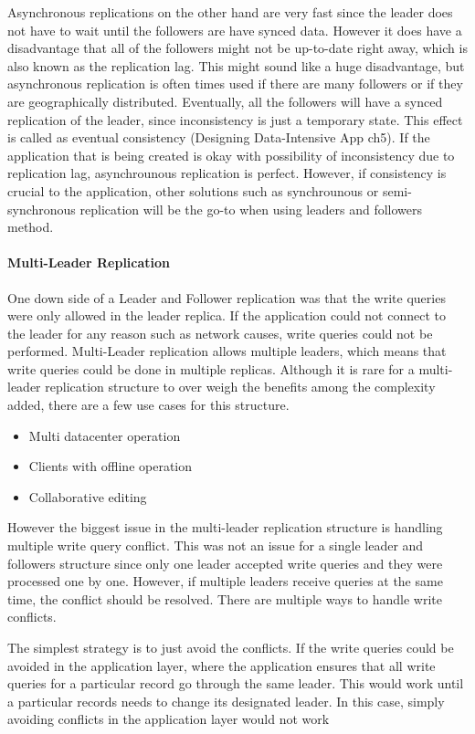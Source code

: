 Asynchronous replications on the other hand are very fast since the leader does not have to wait until the followers are have synced data. However it does have a disadvantage that all of the followers might not be up-to-date right away, which is also known as the replication lag. This might sound like a huge disadvantage, but asynchronous replication is often times used if there are many followers or if they are geographically distributed. Eventually, all the followers will have a synced replication of the leader, since inconsistency is just a temporary state. This effect is called as eventual consistency (Designing Data-Intensive App ch5). If the application that is being created is okay with possibility of inconsistency due to replication lag, asynchrounous replication is perfect. However, if consistency is crucial to the application, other solutions such as synchrounous or semi-synchronous replication will be the go-to when using leaders and followers method. 


\paragraph{Multi-Leader Replication}
One down side of a Leader and Follower replication was that the write queries were only allowed in the leader replica. If the application could not connect to the leader for any reason such as network causes, write queries could not be performed. Multi-Leader replication allows multiple leaders, which means that write queries could be done in multiple replicas. 
Although it is rare for a multi-leader replication structure to over weigh the benefits among the complexity added, there are a few use cases for this structure.
\begin{itemize}
    \item Multi datacenter operation
    \item Clients with offline operation
    \item Collaborative editing
\end{itemize}
However the biggest issue in the multi-leader replication structure is handling multiple write query conflict. This was not an issue for a single leader and followers structure since only one leader accepted write queries and they were processed one by one. However, if multiple leaders receive queries at the same time, the conflict should be resolved. There are multiple ways to handle write conflicts.

The simplest strategy is to just avoid the conflicts. If the write queries could be avoided in the application layer, where the application ensures that all write queries for a particular record go through the same leader. This would work until a particular records needs to change its designated leader. In this case, simply avoiding conflicts in the application layer would not work

